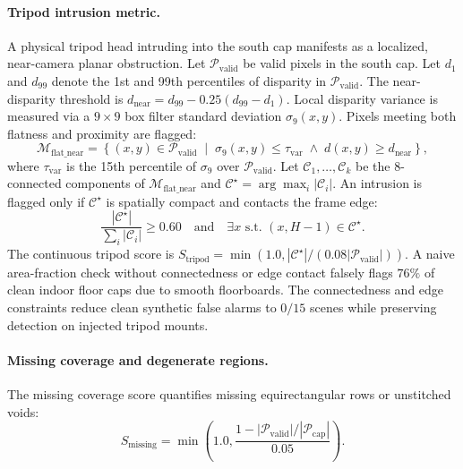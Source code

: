 \documentclass{article}
\begin{document}
\paragraph{Tripod intrusion metric.} A physical tripod head intruding into the south cap manifests as a localized, near-camera planar obstruction. Let $\mathcal{P}_{\mathrm{valid}}$ be valid pixels in the south cap. Let $d_{1}$ and $d_{99}$ denote the 1st and 99th percentiles of disparity in $\mathcal{P}_{\mathrm{valid}}$. The near-disparity threshold is $d_{\mathrm{near}} = d_{99} - 0.25 (d_{99} - d_1)$. Local disparity variance is measured via a $9\times 9$ box filter standard deviation $\sigma_9(x,y)$. Pixels meeting both flatness and proximity are flagged:
\begin{equation}
\mathcal{M}_{\mathrm{flat\_near}} = \left\{ (x,y) \in \mathcal{P}_{\mathrm{valid}} \;\middle|\; \sigma_9(x,y) \le \tau_{\mathrm{var}} \;\land\; d(x,y) \ge d_{\mathrm{near}} \right\},
\end{equation}
where $\tau_{\mathrm{var}}$ is the 15th percentile of $\sigma_9$ over $\mathcal{P}_{\mathrm{valid}}$. Let $\mathcal{C}_1, \dots, \mathcal{C}_k$ be the 8-connected components of $\mathcal{M}_{\mathrm{flat\_near}}$ and $\mathcal{C}^\star = \arg\max_i |\mathcal{C}_i|$. An intrusion is flagged only if $\mathcal{C}^\star$ is spatially compact and contacts the frame edge:
\begin{equation}
\frac{|\mathcal{C}^\star|}{\sum_{i} |\mathcal{C}_i|} \ge 0.60 \quad \text{and} \quad \exists x \text{ s.t. } (x, H-1) \in \mathcal{C}^\star.
\end{equation}
The continuous tripod score is $S_{\mathrm{tripod}} = \min(1.0, |\mathcal{C}^\star| / (0.08 |\mathcal{P}_{\mathrm{valid}}|))$. A naive area-fraction check without connectedness or edge contact falsely flags $76\%$ of clean indoor floor caps due to smooth floorboards. The connectedness and edge constraints reduce clean synthetic false alarms to $0/15$ scenes while preserving detection on injected tripod mounts.

\paragraph{Missing coverage and degenerate regions.} The missing coverage score quantifies missing equirectangular rows or unstitched voids:
\begin{equation}
S_{\mathrm{missing}} = \min\left(1.0, \frac{1 - |\mathcal{P}_{\mathrm{valid}}| / |\mathcal{P}_{\mathrm{cap}}|}{0.05}\right).
\end{equation}
\end{document}
